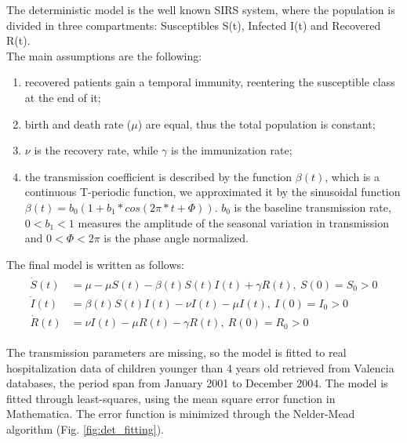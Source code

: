 The deterministic model is the well known SIRS system, where the population is divided in three compartments: Susceptibles S(t), Infected I(t) and Recovered R(t). \\
 The main assumptions are the following: 
 \begin{enumerate}
    \item recovered patients gain a temporal immunity, reentering the susceptible class at the end of it;
    \item birth and death rate ($\mu$) are equal, thus the total population is constant;
    \item $\nu$ is the recovery rate, while $\gamma$ is the immunization rate;
    \item the transmission coefficient is described by the function $\beta(t)$, which is a continuous T-periodic function, we approximated it by the sinusoidal function $\beta(t) = b_{0}(1 + b_{1}*cos(2\pi*t + \Phi))$\cite{weber}. $b_{0}$ is the baseline transmission rate, $0<b_{1}<1$ measures the amplitude of the seasonal variation in transmission and $0<\Phi<2\pi$ is the phase angle normalized.
\end{enumerate}
 The final model is written as follows:
 \begin{gather}
    \begin{aligned}
    \dot{S}(t) &= \mu - \mu S(t) - \beta (t) S(t) I(t) + \gamma R(t), \ S(0)=S_{0} > 0  \\
    \dot{I}(t) &= \beta (t) S(t) I(t) - \nu I(t) - \mu I(t), \ I(0)=I_{0} > 0  \\
    \dot{R}(t) &= \nu I(t) - \mu R(t) - \gamma R(t), \ R(0)=R_{0} > 0 
    \end{aligned}
 \label{eq:System1}
 \end{gather}
 
 The transmission parameters are missing, so the model is fitted to real hospitalization data of children younger than 4 years old retrieved from Valencia databases, the period span from January 2001 to December 2004.
 The model is fitted through least-squares, using the mean square error function in Mathematica. The error function is minimized through the Nelder-Mead algorithm (Fig. \ref{fig:det_fitting}).

